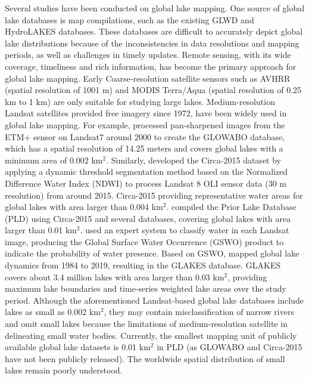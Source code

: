 \documentclass[preprint,12pt,authoryear]{elsarticle}
\begin{document}
Several studies have been conducted on global lake mapping. One source of global lake databases is map compilations, such as the existing GLWD \citep{lehner_development_2004} and HydroLAKES \citep{messager_estimating_2016} databases. These databases are difficult to accurately depict global lake distributions because of the inconsistencies in data resolutions and mapping periods, as well as challenges in timely updates. Remote sensing, with its wide coverage, timeliness and rich information, has become the primary approach for global lake mapping. Early Coarse-resolution satellite sensors such as AVHRR (spatial resolution of 1001 m) and MODIS Terra/Aqua (spatial resolution of 0.25 km to 1 km) are only suitable for studying large lakes. Medium-resolution Landsat satellites provided free imagery since 1972, have been widely used in global lake mapping. For example, \citet{verpoorter_global_2014} processed pan-sharpened images from the ETM+ sensor on Landsat7 around 2000 to create the GLOWABO database, which has a spatial resolution of 14.25 meters and covers global lakes with a minimum area of 0.002 km$^2$. Similarly, \citet{sheng_representative_2016} developed the Circa-2015 dataset by applying a dynamic threshold segmentation method based on the Normalized Difference Water Index (NDWI) \citep{mcfeeters_use_1996} to process Landsat 8 OLI sensor data (30 m resolution) from around 2015. Circa-2015 providing representative water areas for global lakes with area larger than 0.004 km$^2$. \citet{wang_surface_2025} compiled the Prior Lake Database (PLD) using Circa-2015 and several databases, covering global lakes with area larger than 0.01 km$^2$. \citet{pekel_high-resolution_2016} used an expert system to classify water in each Landsat image, producing the Global Surface Water Occurrence (GSWO) product to indicate the probability of water presence. Based on GSWO, \citet{pi_mapping_2022} mapped global lake dynamics from 1984 to 2019, resulting in the GLAKES database. GLAKES covers about 3.4 million lakes with area larger than 0.03 km$^2$, providing maximum lake boundaries and time-series weighted lake areas over the study period. Although the aforementioned Landsat-based global lake databases include lakes as small as 0.002 km$^2$, they may contain misclassification of narrow rivers and omit small lakes because the limitations of medium-resolution satellite in delineating small water bodies. Currently, the smallest mapping unit of publicly available global lake datasets is 0.01 km$^2$ in PLD (as GLOWABO and Circa-2015 have not been publicly released). The worldwide spatial distribution of small lakes remain poorly understood.
\end{document}
